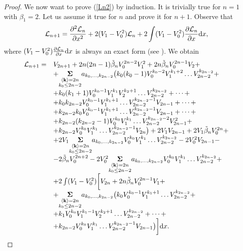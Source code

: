 \documentclass{amsart}
\theoremstyle{definition}
\theoremstyle{remark}
\theoremstyle{remark}
\begin{document}
\begin{proof}
We now want to prove (\ref{Ln2}) by induction. It is trivially true
for $n=1$ with $\beta_1=2$. Let us assume it true for $n$ and prove
it for $n+1$. Observe that
$$
\Lr_{n+1} = {\partial^2\Lr_n\over\partial x^2} + 2(V_1-V_0^2)\Lr_n
+ 2 \int (V_1-V_0^2){\partial\Lr_n\over\partial x}{\rm d}x,
$$
where $(V_1-V_0^2){\partial\Lr_n\over\partial x}{\rm d}x$
is always an exact form (see \cite{lax}). We obtain
$$
\begin{array}{ll}
\Lr_{n+1} =& V_{2n+1}+2n(2n-1)\tilde\beta_n V_0^{2n-2}V_1^2+
2n\tilde\beta_n V_0^{2n-1}V_2 + \\
&+\underset{{\overset{
\scriptstyle \langle{\bf k}\rangle=2n}{\scriptstyle k_0\leq 2n-2}}}
{{\boldsymbol{\Sigma}}}
a_{k_0,\dots,k_{2n-2}}\big(k_0(k_0-1) V_0^{k_0-2} V_1^{k_1+2}\dots
V_{2n-2}^{k_{2n-2}}+\\
&+k_0 (k_1+1) V_0^{k_0-1} V_1^{k_1} V_2^{k_2+1}\dots
V_{2n-2}^{k_{2n-2}}+\dots+\\
&+ k_0 k_{2n-2} V_0^{k_0-1} V_1^{k_1+1} \dots
V_{2n-2}^{k_{2n-2}-1}V_{2n-1}+\dots+\\
&+k_{2n-2}k_0 V_0^{k_0-1} V_1^{k_1+1}\dots
V_{2n-2}^{k_{2n-2}-1}V_{2n-1}+\dots+\\
&+k_{2n-2}(k_{2n-2}-1) V_0^{k_0} V_1^{k_1}\dots
V_{2n-2}^{k_{2n-2}-2}V_{2n-1}^2+\\
&+k_{2n-2}V_0^{k_0} V_1^{k_1}\dots V_{2n-2}^{k_{2n-2}-1}V_{2n}
 \big)+ 2 V_1 V_{2n-1} + 2 V_1 \tilde\beta_n V_0^{2n} +\\
&+2 V_1
\underset{{\overset{
\scriptstyle \langle{\bf k}\rangle=2n}{\scriptstyle k_0\leq 2n-2}}}
{{\boldsymbol{\Sigma}}}
a_{k_0,\dots,k_{2n-2}} V_0^{k_0} V_1^{k_1}\dots
V_{2n-2}^{k_{2n-2}} - 2 V_0^2  V_{2n-1} -\\
&- 2\tilde\beta_n V_0^{2n+2}- 2 V_0^2
\underset{{\overset{
\scriptstyle \langle{\bf k}\rangle=2n}{\scriptstyle k_0\leq 2n-2}}}
{{\boldsymbol{\Sigma}}}
a_{k_0,\dots,k_{2n-2}} V_0^{k_0} V_1^{k_1}\dots
V_{2n-2}^{k_{2n-2}}+\\
&+2 \int (V_1-V_0^2)\bigg[V_{2n}+ 2n\tilde\beta_n V_0^{2n-1}V_1 +\\
&+\underset{{\overset{
\scriptstyle \langle{\bf k}\rangle=2n}{\scriptstyle k_0\leq 2n-2}}}
{{\boldsymbol{\Sigma}}}
a_{k_0,\dots,k_{2n-2}}\big(k_0 V_0^{k_0-1} V_1^{k_1+1}\dots
V_{2n-2}^{k_{2n-2}}+\\
&+k_1 V_0^{k_0} V_1^{k_1-1}V_2^{k_2+1}\dots V_{2n-2}^{k_{2n-2}}+
\dots+\\
&+k_{2n-2} V_0^{k_0} V_1^{k_1}\dots
V_{2n-2}^{k_{2n-2}-1}V_{2n-1} \big)
\bigg]{\rm d}x.\\

\end{array}$$
\end{proof}
\end{document}

